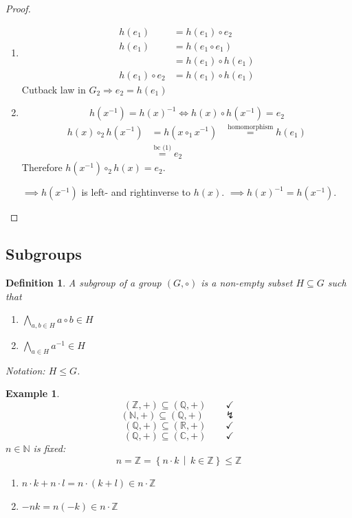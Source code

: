 \documentclass[a4paper,landscape,twocolumn]{article}
\newcommand\setdef[2]{\left\{#1\,\middle|\,#2\right\}}
\newcommand\nope{\lightning}
\newtheorem{defi}{Definition}[section]
\newtheorem{ex}{Example}[section]
\begin{document}
\begin{proof}
  \begin{enumerate}
    \item
      \begin{align*}
                  h(e_1) &= h(e_1) \circ e_2 \\
                  h(e_1) &= h(e_1 \circ e_1) \\
                         &= h(e_1) \circ h(e_1) \\
        h(e_1) \circ e_2 &= h(e_1) \circ h(e_1)
      \end{align*}
      Cutback law in $G_2 \Rightarrow e_2 = h(e_1)$

    \item
      \[ h(x^{-1}) = h(x)^{-1} \iff h(x) \circ h(x^{-1}) = e_2 \]
      \begin{align*}
        h(x) \circ_2 h(x^{-1}) &= h(x \circ_1 x^{-1})
          &\stackrel{\text{homomorphism}}{=} h(e_1) \\
          &\stackrel{\text{bc (1)}}{=} e_2
      \end{align*}
      Therefore $h(x^{-1}) \circ_2 h(x) = e_2$.

      $\implies h(x^{-1})$ is left- and rightinverse to $h(x)$.
      $\implies h(x)^{-1} = h(x^{-1})$.
  \end{enumerate}
\end{proof}

\subsection{Subgroups}

\begin{defi}
  \label{satz-2-22}
  A subgroup of a group $(G, \circ)$ is a non-empty subset $H \subseteq G$ such that
  \begin{enumerate}
    \item $\bigwedge_{a,b \in H} a \circ b \in H$
    \item $\bigwedge_{a \in H} a^{-1} \in H$
  \end{enumerate}
  Notation: $H \leq G$.
\end{defi}

\begin{ex}
  \[ (\mathbb Z, +) \subseteq (\mathbb Q, +) \qquad\checkmark \]
  \[ (\mathbb N, +) \subseteq (\mathbb Q, +) \qquad\nope \]
  \[ (\mathbb Q, +) \subseteq (\mathbb R, +) \qquad\checkmark \]
  \[ (\mathbb Q, +) \subseteq (\mathbb C, +) \qquad\checkmark \]
  $n \in \mathbb N$ is fixed:
  \[ n = \mathbb Z = \setdef{n \cdot k}{k \in \mathbb Z} \leq \mathbb Z \]
  \begin{enumerate}
    \item $n \cdot k + n \cdot l = n \cdot (k + l) \in n\cdot\mathbb Z$
    \item $-nk = n (-k) \in n\cdot\mathbb Z$
  \end{enumerate}
\end{ex}
\end{document}
